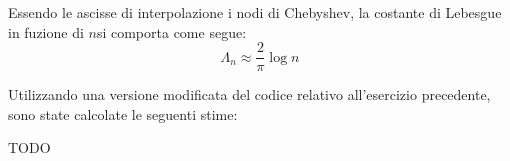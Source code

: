 \begin{center}
\footnotesize\noindent{}\end{center}

\noindent Essendo le ascisse di interpolazione i nodi di Chebyshev, la costante di Lebesgue in fuzione di \(n\)si comporta come segue:
\[
\Lambda_n \approx \frac{2}{\pi}\log n
\]

\noindent Utilizzando una versione modificata del codice relativo all'esercizio precedente, sono state calcolate le seguenti stime:

TODO
